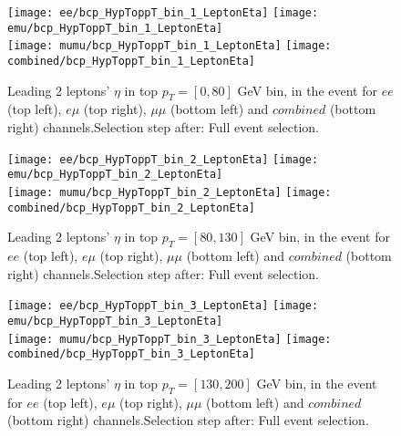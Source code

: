 \begin{figure}
  \texttt{[image: ee/bcp\_HypToppT\_bin\_1\_LeptonEta]}
  \texttt{[image: emu/bcp\_HypToppT\_bin\_1\_LeptonEta]}\\
  \texttt{[image: mumu/bcp\_HypToppT\_bin\_1\_LeptonEta]}
  \texttt{[image: combined/bcp\_HypToppT\_bin\_1\_LeptonEta]}
\caption{Leading 2 leptons' $\eta$ in top $p_T = [0,80]$ GeV bin, in the event for $ee$ (top left), $e\mu$ (top right), $\mu\mu$ (bottom left) and $combined$ (bottom right) channels.\newline Selection step after: Full event selection.}
\end{figure}

\clearpage
\newpage


\begin{figure}
  \texttt{[image: ee/bcp\_HypToppT\_bin\_2\_LeptonEta]}
  \texttt{[image: emu/bcp\_HypToppT\_bin\_2\_LeptonEta]}\\
  \texttt{[image: mumu/bcp\_HypToppT\_bin\_2\_LeptonEta]}
  \texttt{[image: combined/bcp\_HypToppT\_bin\_2\_LeptonEta]}
\caption{Leading 2 leptons' $\eta$ in top $p_T = [80,130]$ GeV bin, in the event for $ee$ (top left), $e\mu$ (top right), $\mu\mu$ (bottom left) and $combined$ (bottom right) channels.\newline Selection step after: Full event selection.}
\end{figure}

\clearpage
\newpage


\begin{figure}
  \texttt{[image: ee/bcp\_HypToppT\_bin\_3\_LeptonEta]}
  \texttt{[image: emu/bcp\_HypToppT\_bin\_3\_LeptonEta]}\\
  \texttt{[image: mumu/bcp\_HypToppT\_bin\_3\_LeptonEta]}
  \texttt{[image: combined/bcp\_HypToppT\_bin\_3\_LeptonEta]}
\caption{Leading 2 leptons' $\eta$ in top $p_T = [130,200]$ GeV bin, in the event for $ee$ (top left), $e\mu$ (top right), $\mu\mu$ (bottom left) and $combined$ (bottom right) channels.\newline Selection step after: Full event selection.}
\end{figure}

\clearpage
\newpage

